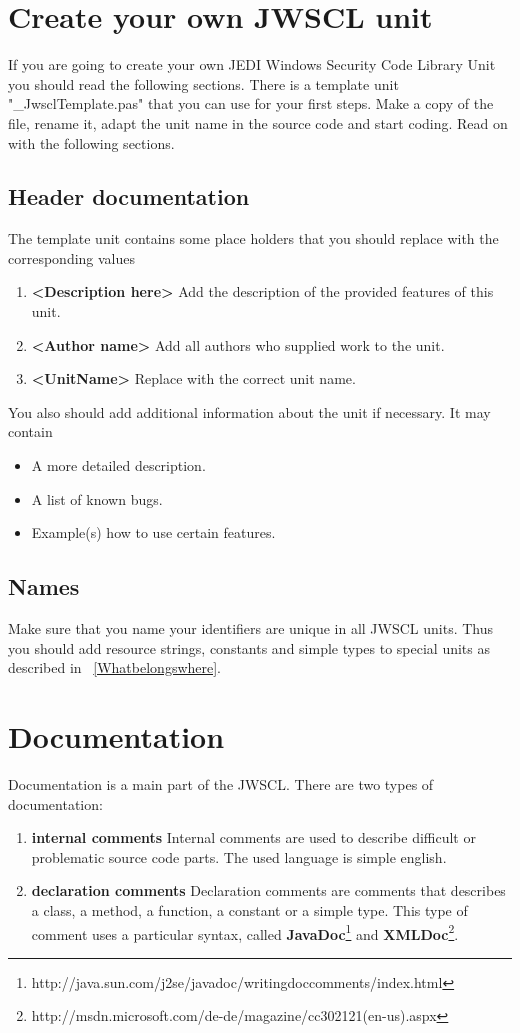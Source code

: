 \documentclass[a4paper,twoside,10pt]{report}
\begin{document}
\section{Create your own JWSCL unit}
If you are going to create your own JEDI Windows Security Code Library Unit you should read the following sections. There is a template unit "\_JwsclTemplate.pas" that you can use for your first steps. Make a copy of the file, rename it, adapt the unit name in the source code and start coding. Read on with the following sections.

\subsection{Header documentation}
The template unit contains some place holders that you should replace with the corresponding values
\begin{enumerate}
	\item \textbf{<Description here>} Add the description of the provided features of this unit.
  \item \textbf{<Author name>} Add all authors who supplied work to the unit.
  \item \textbf{<UnitName>} Replace with the correct unit name.
\end{enumerate}
You also should add additional information about the unit if necessary. It may contain
\begin{itemize}
  \item A more detailed description.
  \item A list of known bugs.
  \item Example(s) how to use certain features.  
\end{itemize}

\subsection{Names}
Make sure that you name your identifiers are unique in all JWSCL units. Thus you should add resource strings, constants and simple types to special units as described in ~\ref{Whatbelongswhere}.

\section{Documentation}
Documentation is a main part of the JWSCL. There are two types of documentation:
\begin{enumerate}
	\item \textbf{internal comments} Internal comments are used to describe difficult or problematic source code parts. 
The used language is simple english.
	\item \textbf{declaration comments} Declaration comments are comments that describes a class, a method, a function, a constant or a simple type. This type of comment uses a particular syntax, called \textbf{JavaDoc}\footnote{http://java.sun.com/j2se/javadoc/writingdoccomments/index.html} and \textbf{XMLDoc}\footnote{http://msdn.microsoft.com/de-de/magazine/cc302121(en-us).aspx}.
\end{enumerate}
\end{document}

